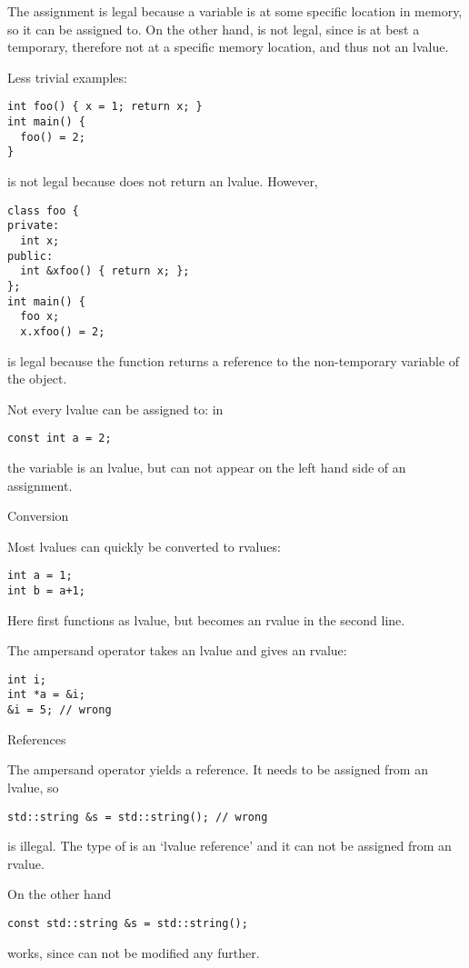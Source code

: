 The assignment  is legal because a variable  is at some specific
location in memory, so it can be assigned to. On the other hand,
 is not legal, since  is at best a temporary,
therefore not at a specific memory location, and thus not an lvalue.

Less trivial examples:
\begin{lstlisting}
int foo() { x = 1; return x; }
int main() {
  foo() = 2;
}
\end{lstlisting}
is not legal because  does not return an lvalue. However,
\begin{lstlisting}
class foo {
private:
  int x;
public:
  int &xfoo() { return x; };
};
int main() {
  foo x;
  x.xfoo() = 2;
\end{lstlisting}
is legal because the function  returns a reference to the
non-temporary variable  of the  object.

Not every lvalue can be assigned to: in
\begin{lstlisting}
const int a = 2;
\end{lstlisting}
the variable  is an lvalue, but can not appear on the left hand
side of an assignment.

 {Conversion}

Most lvalues can quickly be converted to rvalues:
\begin{lstlisting}
int a = 1;
int b = a+1;
\end{lstlisting}
Here  first functions as lvalue, but becomes an rvalue in the
second line.

The ampersand operator takes an lvalue and gives an rvalue:
\begin{lstlisting}
int i;
int *a = &i;
&i = 5; // wrong
\end{lstlisting}

 {References}

The ampersand operator yields a reference. It needs to be assigned
from an lvalue, so
\begin{lstlisting}
std::string &s = std::string(); // wrong
\end{lstlisting}
is illegal. The type of  is an `lvalue reference' and it can not
be assigned from an rvalue.

On the other hand
\begin{lstlisting}
const std::string &s = std::string();
\end{lstlisting}
works, since  can not be modified any further.

